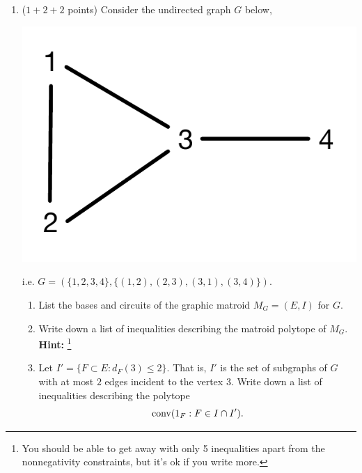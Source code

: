 \documentclass[12pt]{article}
\begin{document}
\begin{enumerate}
\item ($1 + 2+ 2$ points) Consider the undirected graph $G$ below,
\begin{center}
\includegraphics[scale=.5]{../figures/final-graph.pdf}
\end{center}
i.e. $G = (\{1,2,3,4\}, \{(1,2), (2,3), (3,1), (3,4)\})$.
\begin{enumerate}
\item List the bases and circuits of the graphic matroid $M_G = (E, I)$ for $G$.
\item Write down a list of inequalities describing the matroid polytope of $M_G$. \textbf{Hint: }\footnote{You should be able to get away with only 5 inequalities apart from the nonnegativity constraints, but it's ok if you write more.}
\item Let $I' = \{F \subset E:  d_F(3) \leq 2\}$. That is, $I'$ is the set of subgraphs of $G$ with at most $2$ edges incident to the vertex $3$. Write down a list of inequalities describing the polytope
$$ \operatorname{conv}(1_F: F \in I \cap I').$$
\end{enumerate}


\end{enumerate}
\end{document}
